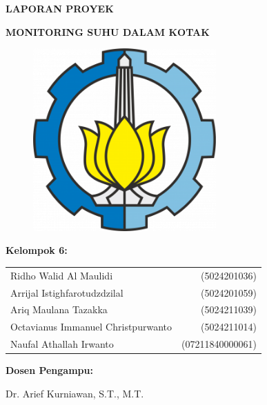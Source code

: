 
\begin{titlepage}
   \begin{center}

       \textbf{\LARGE LAPORAN PROYEK} 
       \vspace{0.5cm}
       
       \textbf{\fontsize{18}{20}\selectfont MONITORING SUHU DALAM KOTAK} \\

       \vspace{0.7cm}
       \begin{figure}[htp]
         \centering
         \includegraphics[width=7cm]{image/ITS.png}
          \label{fig:Cover}
        \end{figure}
       
       \vspace{0.5cm}
       
       \textbf{\large Kelompok 6:}

       \begin{tabular}{@{}l r@{}}
            Ridho Walid Al Maulidi & (5024201036) \\
            Arrijal Istighfarotudzdzilal & (5024201059) \\
            Ariq Maulana Tazakka & (5024211039) \\
            Octavianus Immanuel Christpurwanto & (5024211014) \\
            Naufal Athallah Irwanto & (07211840000061) \\
        \end{tabular}

        \vspace{0.5cm}
       
       \textbf{\large Dosen Pengampu:}
       
       \vspace{0.3cm}
       Dr. Arief Kurniawan, S.T., M.T.


\end{center}
\end{titlepage}
